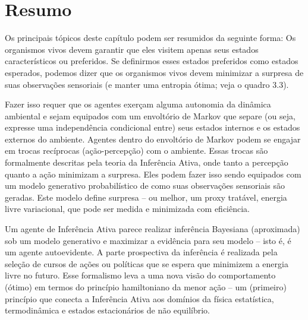\documentclass[
  12pt,
]{book}
\begin{document}
\hypertarget{resumo-2}{%
\section{Resumo}\label{resumo-2}}

Os principais tópicos deste capítulo podem ser resumidos da seguinte forma: Os organismos vivos devem garantir que eles visitem apenas seus estados característicos ou preferidos. Se definirmos esses estados preferidos como estados esperados, podemos dizer que os organismos vivos devem minimizar a surpresa de suas observações sensoriais (e manter uma entropia ótima; veja o quadro 3.3).

Fazer isso requer que os agentes exerçam alguma autonomia da dinâmica ambiental e sejam equipados com um envoltório de Markov que separe (ou seja, expresse uma independência condicional entre) seus estados internos e os estados externos do ambiente. Agentes dentro do envoltório de Markov podem se engajar em trocas recíprocas (ação-percepção) com o ambiente. Essas trocas são formalmente descritas pela teoria da Inferência Ativa, onde tanto a percepção quanto a ação minimizam a surpresa. Eles podem fazer isso sendo equipados com um modelo generativo probabilístico de como suas observações sensoriais são geradas. Este modelo define surpresa -- ou melhor, um proxy tratável, energia livre variacional, que pode ser medida e minimizada com eficiência.

Um agente de Inferência Ativa parece realizar inferência Bayesiana (aproximada) sob um modelo generativo e maximizar a evidência para seu modelo -- isto é, é um agente autoevidente. A parte prospectiva da inferência é realizada pela seleção de cursos de ações ou políticas que se espera que minimizem a energia livre no futuro. Esse formalismo leva a uma nova visão do comportamento (ótimo) em termos do princípio hamiltoniano da menor ação -- um (primeiro) princípio que conecta a Inferência Ativa aos domínios da física estatística, termodinâmica e estados estacionários de não equilíbrio.
\end{document}
